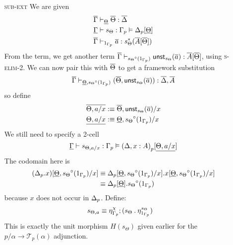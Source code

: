 \documentclass[10pt]{article}
\theoremstyle{definition}
\newcommand{\yields}{\vdash}
\newcommand\UnSt[2]{\ensuremath{\mathsf{unst}_{#1}(#2)}}
\newcommand\TrCirc[2]{\ensuremath{{#1}^\circ(#2)}}
\newcommand\El[2]{\mathcal{T}_{#1}(#2)}
\newcommand\bdot[0]{\mathbin{.}}
\begin{document}
\begin{enumerate}
\item[\textsc{sub-ext}] We are given
\begin{align*}
\upstairs{\Gamma} &\yields_{\downstairs{\Theta}} \upstairs{\Theta} : \upstairs{\Delta} \\
\downstairs{\Gamma} &\yields s_\Theta : \asdep{\Gamma} \vDash \asdep{\Delta}[\downstairs{\Theta}] \\
\upstairs{\Gamma} &\yields_{1_{\asdep{\Gamma}}} \upstairs{a} : s_{\Theta}^*(\upstairs{A}[\upstairs{\Theta}])
\end{align*}
From the term, we get another term $\upstairs{\Gamma}\yields_{\TrCirc{s_{\Theta}}{1_{\asdep{\Gamma}}}} \UnSt{s_\Theta}{\upstairs{a}} : \upstairs{A}[\upstairs{\Theta}]$, using \textsc{s-elim-2}. We can now pair this with $\overline{\Theta}$ to get a framework substitution \[\upstairs{\Gamma} \yields_{\downstairs{\Theta}, \TrCirc{s_{\Theta}}{1_{\asdep{\Gamma}}}} (\upstairs{\Theta}, \UnSt{s_\Theta}{\upstairs{a}}) : \upstairs{\Delta}, \upstairs{A}\]
so define
\begin{align*}
\upstairs{\Theta, a/x} &:\equiv \upstairs{\Theta}, \UnSt{s_\Theta}{\upstairs{a}}/x \\
\downstairs{\Theta, a/x} &:\equiv \downstairs{\Theta}, \TrCirc{s_{\Theta}}{1_{\asdep{\Gamma}}}/x
\end{align*}
We still need to specify a 2-cell 
\[
\downstairs{\Gamma} \yields s_{\Theta, a/x} : \asdep{\Gamma} \vDash \asdep{(\Delta, x : A)}[\downstairs{\Theta, a/x}]
\]
The codomain here is
\begin{align*}
(\asdep{\Delta}.x)[\downstairs{\Theta}, \TrCirc{s_{\Theta}}{1_{\asdep{\Gamma}}}/x] 
&\equiv \asdep{\Delta}[\downstairs{\Theta}, \TrCirc{s_{\Theta}}{1_{\asdep{\Gamma}}}/x].x[\downstairs{\Theta}, \TrCirc{s_{\Theta}}{1_{\asdep{\Gamma}}}/x] \\
&\equiv \asdep{\Delta}[\downstairs{\Theta}].\TrCirc{s_{\Theta}}{1_{\asdep{\Gamma}}}
\end{align*}
because $x$ does not occur in ${\Delta}_p$. Define:
\begin{align*}
s_{\Theta, a} &\equiv \eta^\chi_{\asdep{\Gamma}}; (s_\Theta \bdot \eta_{1_{\asdep{\Gamma}}}^{s_\Theta})
\end{align*}
This is exactly the unit morphism $H(s_\Theta)$ given earlier for the $p/\alpha \to \El{p}{\alpha}$ adjunction.


\end{enumerate}
\end{document}
